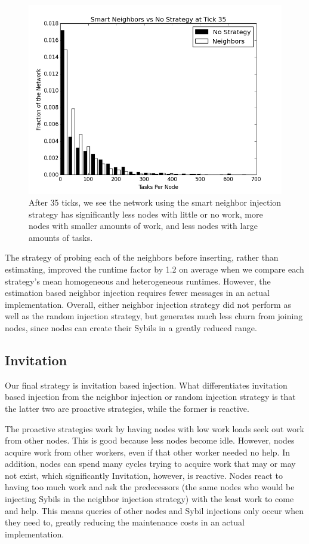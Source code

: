 \documentclass[11pt,letterpaper]{article}
\begin{document}
{	
	\begin{figure}
		\centering
		\includegraphics[width=0.7\linewidth]{figs/neighborsStableSmartHist35}
		\caption[Smart Neighbor injection  vs no strategy after 35 ticks.]{After 35 ticks, we see the network using the smart neighbor injection strategy has significantly less nodes with little or no work, more nodes with smaller amounts of work, and less nodes with large amounts of tasks.}
		\label{fig:neighborsStableSmartHist35}
	\end{figure}
	
	
	
	The strategy of probing each of the neighbors before inserting, rather than estimating, improved the runtime factor by 1.2  on average when we compare each strategy's mean homogeneous and heterogeneous runtimes.
	However, the estimation based neighbor injection requires fewer messages in an actual implementation.
	Overall, either neighbor injection strategy did not perform as well as the random injection strategy, but generates much less churn from joining nodes, since nodes can create their Sybils in a greatly reduced range.
	
	\subsection{Invitation}
	Our final strategy is invitation based injection.
	What differentiates invitation based injection from the neighbor injection or random injection strategy is that the latter two are proactive strategies, while the former is reactive.
	
	The proactive strategies work by having nodes with low work loads seek out work from other nodes.
	This is good because less nodes become idle.
	However, nodes acquire work from other workers, even if that other worker needed no help.
	In addition, nodes can spend many cycles trying to acquire work that may or may not exist, which significantly 
	Invitation, however, is reactive.
	Nodes react to having too much work and ask the predecessors (the same nodes who would be injecting Sybils in the neighbor injection strategy) with the least work to come and help.
	This means queries of other nodes and Sybil injections only occur when they need to, greatly reducing the maintenance costs in an actual implementation.
	
}
\end{document}
